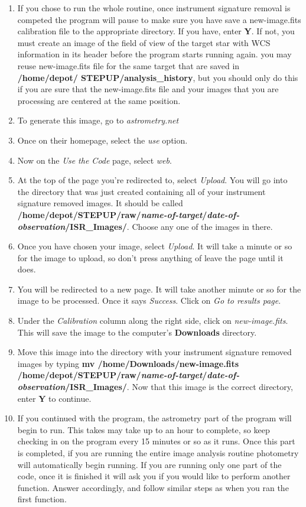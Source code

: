 \documentclass[11pt]{report}
\begin{document}
\begin{enumerate}
\item If you chose to run the whole routine, once instrument signature removal is competed the program will pause to make sure you have save a new-image.fits calibration file to the appropriate directory. If you have, enter {\bf Y}. If not, you must create an image of the field of view of the target star with WCS information in its header before the program starts running again.
 you may reuse new-image.fits file for the same target that are saved in {\bf /home/depot/ \linebreak STEPUP/analysis\_history}, but you should only do this if you are sure that the new-image.fits file and your images that you are processing are centered at the same position.
\item To generate this image, go to \emph{astrometry.net}
\item Once on their homepage, select the \emph{use} option. 
\item Now on the \emph{Use the Code} page, select \emph{web}.
\item At the top of the page you're redirected to, select \emph{Upload}. You will go into the directory that was just created containing all of your instrument signature removed images. It should be called {\bf /home/depot/STEPUP/raw/\emph{name-of-target}/\emph{date-of-observation}/ISR\_Images/}. Choose any one of the images in there.
\item Once you have chosen your image, select \emph{Upload}. It will take a minute or so for the image to upload, so don't press anything of leave the page until it does.
\item You will be redirected to a new page. It will take another minute or so for the image to be processed. Once it says \emph{Success}. Click on \emph{Go to results page}.
\item Under the \emph{Calibration} column along the right side, click on \emph{new-image.fits}. This will save the image to the computer's {\bf Downloads} directory.
\item Move this image into the directory with your instrument signature removed images by typing {\bf mv /home/Downloads/new-image.fits /home/depot/STEPUP/raw/\emph{name-of-target}/\emph{date-of-observation}/ISR\_Images/}. Now that this image is the correct directory, enter {\bf Y} to continue.
\item If you continued with the program, the astrometry part of the program will begin to run. This takes may take up to an hour to complete, so keep checking in on the program every 15 minutes or so as it runs. Once this part is completed, if you are running the entire image analysis routine photometry will automatically begin running. If you are running only one part of the code, once it is finished it will ask you if you would like to perform another function. Answer accordingly, and follow similar steps as when you ran the first function.

\end{enumerate}
\end{document}
